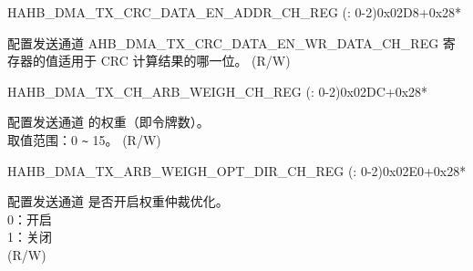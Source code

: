 \begin{register}{H}{AHB\_DMA\_TX\_CRC\_DATA\_EN\_ADDR\_CH\_REG (: 0-2)}{0x02D8+0x28*}\label{regdesc:AHBDMATXCRCDATAENADDRCHNREG}
%
\regnewline%
\begin{regdesc}\begin{reglist}
\label{fielddesc:AHBDMATXCRCDATAENADDRCHN}\item [AHB\_DMA\_TX\_CRC\_DATA\_EN\_ADDR\_CH\regindex{n}] 配置发送通道  AHB\_DMA\_TX\_CRC\_DATA\_EN\_WR\_DATA\_CH\_REG 寄存器的值适用于 CRC 计算结果的哪一位。 (R/W)
\end{reglist}\end{regdesc}
\end{register}


\begin{register}{H}{AHB\_DMA\_TX\_CH\_ARB\_WEIGH\_CH\_REG (: 0-2)}{0x02DC+0x28*}\label{regdesc:AHBDMATXCHARBWEIGHCHNREG}
%
%
\regnewline%
\begin{regdesc}\begin{reglist}
\label{fielddesc:AHBDMATXCHARBWEIGHCHN}\item [AHB\_DMA\_TX\_CH\_ARB\_WEIGH\_CH\regindex{n}] 配置发送通道  的权重（即令牌数）。\\
取值范围：0 \verb+~+ 15。 (R/W)
\end{reglist}\end{regdesc}
\end{register}


\begin{register}{H}{AHB\_DMA\_TX\_ARB\_WEIGH\_OPT\_DIR\_CH\_REG (: 0-2)}{0x02E0+0x28*}\label{regdesc:AHBDMATXARBWEIGHOPTDIRCHNREG}
%
%
\regnewline%
\begin{regdesc}\begin{reglist}
\label{fielddesc:AHBDMATXARBWEIGHOPTDIRCHN}\item [AHB\_DMA\_TX\_ARB\_WEIGH\_OPT\_DIR\_CH\regindex{n}] 配置发送通道  是否开启权重仲裁优化。\\
0：开启\\
1：关闭\\ (R/W)
\end{reglist}\end{regdesc}
\end{register}


